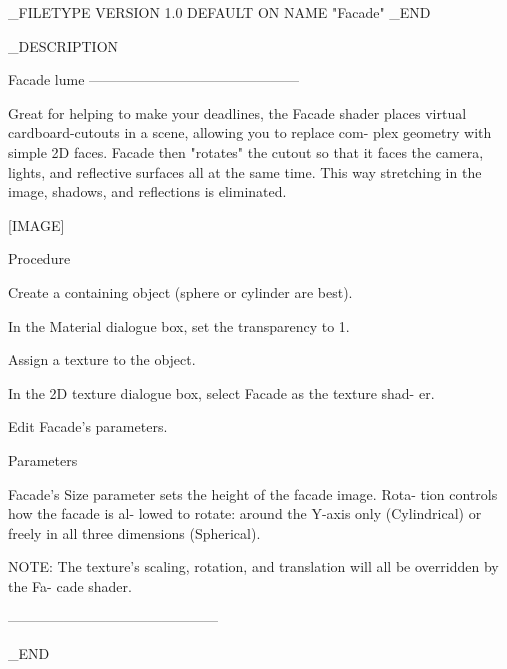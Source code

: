 _FILETYPE
VERSION	 1.0
DEFAULT	 ON
NAME	"Facade"
_END


_DESCRIPTION


Facade                                   lume
---------------------------------------------


       Great for helping to make your
       deadlines, the Facade shader places
       virtual cardboard-cutouts in a
       scene, allowing you to replace com-
       plex geometry with simple 2D faces.
       Facade then "rotates" the cutout so
       that it faces the camera, lights,
       and reflective surfaces all at the
       same time. This way stretching in
       the image, shadows, and reflections
       is eliminated.

       [IMAGE]



  Procedure

        Create a containing object (sphere
        or cylinder are best).

        In the Material dialogue box, set
        the transparency to 1.

        Assign a texture to the object.

        In the 2D texture dialogue box,
        select Facade as the texture shad-
        er.

        Edit Facade's parameters.



  Parameters

       Facade's Size parameter sets the
       height of the facade image. Rota-
       tion controls how the facade is al-
       lowed to rotate: around the Y-axis
       only (Cylindrical) or freely in all
       three dimensions (Spherical).

            NOTE: The texture's scaling,
            rotation, and translation will
            all be overridden by the Fa-
            cade shader.

---------------------------------------------

_END


